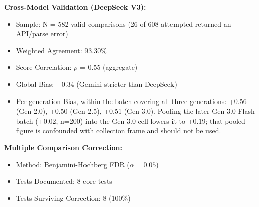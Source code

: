 \documentclass[sigconf,screen]{acmart}
\begin{document}
\textbf{Cross-Model Validation (DeepSeek V3):}
\begin{itemize}
\item Sample: N = 582 valid comparisons (26 of 608 attempted returned an API/parse error)
\item Weighted Agreement: 93.30\%
\item Score Correlation: $\rho$ = 0.55 (aggregate)
\item Global Bias: +0.34 (Gemini stricter than DeepSeek)
\item Per-generation Bias, within the batch covering all three generations: +0.56 (Gen 2.0), +0.50 (Gen 2.5), +0.51 (Gen 3.0). Pooling the later Gen 3.0 Flash batch (+0.02, n=200) into the Gen 3.0 cell lowers it to +0.19; that pooled figure is confounded with collection frame and should not be used.

\end{itemize}
\textbf{Multiple Comparison Correction:}
\begin{itemize}
\item Method: Benjamini-Hochberg FDR ($\alpha = 0.05$)
\item Tests Documented: 8 core tests
\item Tests Surviving Correction: 8 (100\%)

\end{itemize}

\end{document}
